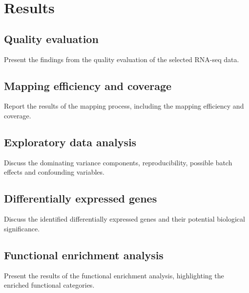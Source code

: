 \section{Results}

\subsection{Quality evaluation}
Present the findings from the quality evaluation of the selected RNA-seq data.

\subsection{Mapping efficiency and coverage}
Report the results of the mapping process, including the mapping efficiency and coverage.

\subsection{Exploratory data analysis}
Discuss the dominating variance components, reproducibility, possible batch effects and confounding variables.

\subsection{Differentially expressed genes}
Discuss the identified differentially expressed genes and their potential biological significance.

\subsection{Functional enrichment analysis}
Present the results of the functional enrichment analysis, highlighting the enriched functional categories.